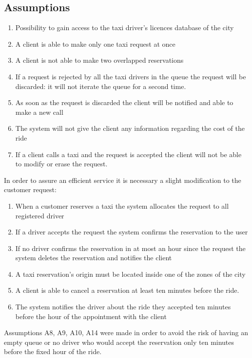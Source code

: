 \documentclass[a4paper]{article}
\begin{document}
\subsection{Assumptions}
\begin{enumerate}[label=\bfseries A\arabic*:]
\item Possibility to gain access to the taxi driver's licences database of the city
\item A client is able to make only one taxi request at once
\item A client is not able to make two overlapped reservations
\item If a request is rejected by all the taxi drivers in the queue the request will be discarded: it will not iterate the queue for a second time.
\item As soon as the request is discarded the client will be notified and able to make a new call
\item The system will not give the client any information regarding the cost of the ride
\item If a client calls a taxi and the request is accepted the client will not be able to modify or erase the request.
\end{enumerate}

In order to assure an efficient service it is necessary a slight modification to the customer request:

\begin{enumerate}[label=\bfseries A\arabic*:, resume]
\item When a customer reserves a taxi the system allocates the request to all registered driver
\item If a driver accepts the request the system confirms the reservation to the user
\item If no driver confirms the reservation in at most an hour since the request the system deletes the reservation and notifies the client
\item A taxi reservation's origin must be located inside one of the zones of the city
\item A client is able to cancel a reservation at least ten minutes before the ride.
\item The system notifies the driver about the ride they accepted ten minutes before the hour of the appointment with the client
\end{enumerate}

Assumptions A8, A9, A10, A14 were made in order to avoid the risk of having an empty queue or no driver who would accept the reservation only ten minutes before the fixed hour of the ride.
\end{document}

